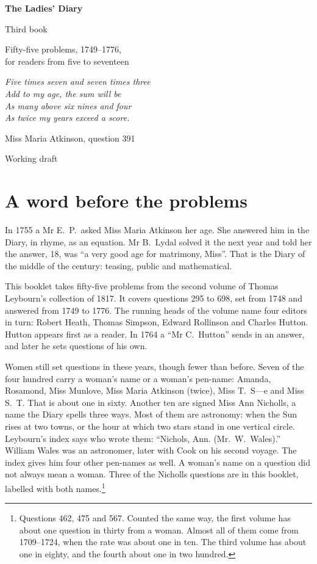 \documentclass[11pt,a4paper]{article}
\newcounter{prob}
\begin{document}
\begin{titlepage}
\centering
\vspace*{3cm}
{\Huge\bfseries The Ladies' Diary\par}
\vspace{0.4cm}
{\LARGE Third book\par}
\vspace{0.8cm}
{\Large Fifty-five problems, 1749--1776,\\ for readers from five to seventeen\par}
\vspace{2cm}
{\large\itshape Five times seven and seven times three\\
Add to my age, the sum will be\\
As many above six nines and four\\
As twice my years exceed a score.\par}
\vspace{0.3cm}
{\small Miss Maria Atkinson, question 391\par}
\vfill
{\large Working draft\par}
\end{titlepage}

\section*{A word before the problems}

In 1755 a Mr E.~P.\ asked Miss Maria Atkinson her age. She answered him in the Diary, in
rhyme, as an equation. Mr B.~Lydal solved it the next year and told her the answer, 18,
was ``a very good age for matrimony, Miss''. That is the Diary of the middle of the
century: teasing, public and mathematical.

This booklet takes fifty-five problems from the second volume of Thomas Leybourn's
collection of 1817. It covers questions 295 to 698, set from 1748 and answered from
1749 to 1776. The running heads of the volume name four editors in turn: Robert Heath,
Thomas Simpson, Edward Rollinson and Charles Hutton. Hutton appears first as a reader.
In 1764 a ``Mr C.~Hutton'' sends in an answer, and later he sets questions of his own.

Women still set questions in these years, though fewer than before. Seven of the four
hundred carry a woman's name or a woman's pen-name: Amanda, Rosamond, Miss Munlove,
Miss Maria Atkinson (twice), Miss T.~S---e and Miss S.~T. That is about one in sixty.
Another ten are signed Miss Ann Nicholls, a name the Diary spells three ways. Most of
them are astronomy: when the Sun rises at two towns, or the hour at which two stars
stand in one vertical circle. Leybourn's index says who wrote them: ``Nichols, Ann.
(Mr.~W.~Wales).'' William Wales was an astronomer, later with Cook on his second
voyage. The index gives him four other pen-names as well. A woman's name on a question
did not always mean a woman. Three of the Nicholls questions are in this booklet,
labelled with both names.\footnote{Questions 462, 475 and 567. Counted the same way,
the first volume has about one question in thirty from a woman. Almost all of them
come from 1709--1724, when the rate was about one in ten. The third volume has about
one in eighty, and the fourth about one in two hundred.}
\end{document}
